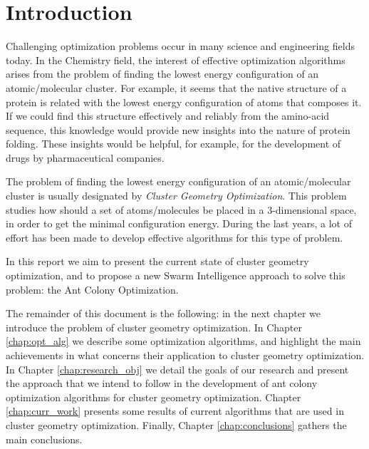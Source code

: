 \chapter{Introduction}
Challenging optimization problems occur in many science and engineering fields today. In the Chemistry field, the interest of effective optimization algorithms arises from the problem of finding the lowest energy configuration of an atomic/molecular cluster. For example, it seems that the native structure of a protein is related with the lowest energy configuration of atoms that composes it. If we could find this structure effectively and reliably from the amino-acid sequence, this knowledge would provide new insights into the nature of protein folding. These insights would be helpful, for example, for the development of drugs by pharmaceutical companies.

The problem of finding the lowest energy configuration of an atomic/molecular cluster is usually designated by \emph{Cluster Geometry Optimization}. This problem studies how should a set of atoms/molecules be placed in a 3-dimensional space, in order to get the minimal configuration energy. During the last years, a lot of effort has been made to develop effective algorithms for this type of problem.

In this report we aim to present the current state of cluster geometry optimization, and to propose a new Swarm Intelligence approach to solve this problem: the Ant Colony Optimization.

The remainder of this document is the following: in the next chapter we introduce the problem of cluster geometry optimization. In Chapter \ref{chap:opt_alg} we describe some optimization algorithms, and highlight the main achievements in what concerns their application to cluster geometry optimization. In Chapter \ref{chap:research_obj} we detail the goals of our research and present the approach that we intend to follow in the development of ant colony optimization algorithms for cluster geometry optimization. Chapter \ref{chap:curr_work} presents some results of current algorithms that are used in cluster geometry optimization. Finally, Chapter \ref{chap:conclusions} gathers the main conclusions.



